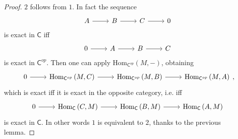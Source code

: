 \documentclass[../Main]{subfiles}
\begin{document}
\begin{proof}
	$2$ follows from $1$. In fact the sequence
	\begin{equation}
	\begin{tikzcd}
		A \arrow[r, "", rightarrow] &
		B \arrow[r, "", rightarrow] &
		C \arrow[r, "", rightarrow] &
		0
	\end{tikzcd}
	\end{equation} 
	is exact in $\mathsf{C}$ iff
	\begin{equation}
	\begin{tikzcd}
		0 \arrow[r, "", rightarrow] &
		A \arrow[r, "", rightarrow] &
		B \arrow[r, "", rightarrow] &
		C
	\end{tikzcd}
	\end{equation} 
	is exact in $\mathsf{C}^{op}$.
	Then one can apply $\mathrm{Hom}_{\mathsf{C}^{op}} \left( M, - \right)$,
	obtaining
	\begin{equation}
	\begin{tikzcd}
		0 \arrow[r, "", rightarrow] &
		\mathrm{Hom}_{\mathsf{C}^{op}} \left( M, C \right) \arrow[r, "", rightarrow] &
		\mathrm{Hom}_{\mathsf{C}^{op}} \left( M, B \right) \arrow[r, "", rightarrow] &
		\mathrm{Hom}_{\mathsf{C}^{op}} \left( M, A \right)
	\end{tikzcd}
	,\end{equation} 
	which is exact iff it is exact in the opposite category, i.e. iff
	\begin{equation}
	\begin{tikzcd}
		0 \arrow[r, "", rightarrow] &
		\mathrm{Hom}_{\mathsf{C}} \left( C, M \right) \arrow[r, "", rightarrow] &
		\mathrm{Hom}_{\mathsf{C}} \left( B, M \right) \arrow[r, "", rightarrow] &
		\mathrm{Hom}_{\mathsf{C}} \left( A, M \right)
	\end{tikzcd}
	\end{equation} 
	is exact in $\mathsf{C}$.
	In other words $1$ is equivalent to $2$, thanks to the previous lemma.


\end{proof}
\end{document}
